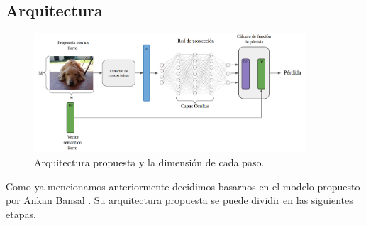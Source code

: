 \subsection{Arquitectura} \label{ssec:arquitectura}
\begin{figure}
	\centering
	\includegraphics[width=0.9\textwidth]{img/arquitectura.png}
	\caption{Arquitectura propuesta y la dimensión de cada paso.}
	\label{fig:arqutectura}
\end{figure}
Como ya mencionamos anteriormente decidimos basarnos en el modelo propuesto por Ankan Bansal \cite{bansal2018zero}. Su arquitectura propuesta se puede dividir en las siguientes etapas.
